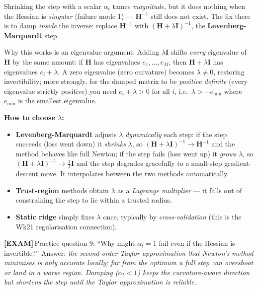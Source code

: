 \documentclass[11pt, a4paper]{article}
\newcommand{\examflag}{\textcolor{tipBd}{\textbf{[EXAM]}}\,}
\begin{document}
\begin{notebox}
Shrinking the step with a scalar $\alpha_t$ tames \emph{magnitude}, but it does nothing when the Hessian is \emph{singular} (failure mode 1) — $\mathbf{H}^{-1}$ still does not exist. The fix there is to damp \emph{inside} the inverse: replace $\mathbf{H}^{-1}$ with $(\mathbf{H}+\lambda\mathbf{I})^{-1}$, the \textbf{Levenberg-Marquardt} step.

Why this works is an eigenvalue argument. Adding $\lambda\mathbf{I}$ shifts \emph{every} eigenvalue of $\mathbf{H}$ by the same amount: if $\mathbf{H}$ has eigenvalues $e_1,\ldots,e_M$, then $\mathbf{H}+\lambda\mathbf{I}$ has eigenvalues $e_i + \lambda$. A zero eigenvalue (zero curvature) becomes $\lambda\ne 0$, restoring invertibility; more strongly, for the damped matrix to be \emph{positive definite} (every eigenvalue strictly positive) you need $e_i + \lambda > 0$ for all $i$, i.e.\ $\lambda > -e_{\min}$ where $e_{\min}$ is the smallest eigenvalue.

\textbf{How to choose $\lambda$:}
\begin{itemize}[leftmargin=1.4em, itemsep=0.15em]
  \item \textbf{Levenberg-Marquardt} adjusts $\lambda$ \emph{dynamically} each step: if the step succeeds (loss went down) it \emph{shrinks} $\lambda$, so $(\mathbf{H}+\lambda\mathbf{I})^{-1}\to\mathbf{H}^{-1}$ and the method behaves like full Newton; if the step fails (loss went up) it \emph{grows} $\lambda$, so $(\mathbf{H}+\lambda\mathbf{I})^{-1}\to\tfrac{1}{\lambda}\mathbf{I}$ and the step degrades gracefully to a small-step gradient-descent move. It interpolates between the two methods automatically.
  \item \textbf{Trust-region} methods obtain $\lambda$ as a \emph{Lagrange multiplier} — it falls out of constraining the step to lie within a trusted radius.
  \item \textbf{Static ridge} simply fixes $\lambda$ once, typically by \emph{cross-validation} (this is the Wk21 regularisation connection).
\end{itemize}
\end{notebox}

\examflag{}Practice question 9: ``Why might $\alpha_t = 1$ fail even if the Hessian is invertible?'' Answer: \emph{the second-order Taylor approximation that Newton's method minimises is only accurate locally; far from the optimum a full step can overshoot or land in a worse region. Damping ($\alpha_t < 1$) keeps the curvature-aware direction but shortens the step until the Taylor approximation is reliable.}
\end{document}
